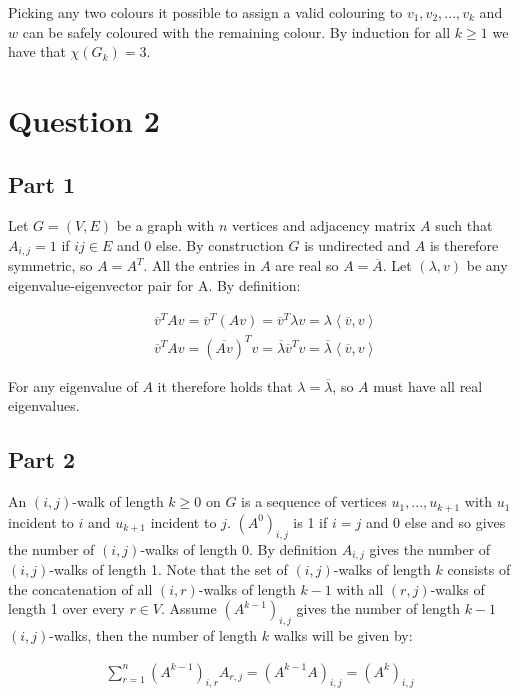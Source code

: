 \documentclass{article}
\begin{document}
Picking any two colours it possible to assign a valid colouring to $v_1, v_2,...,v_k$ and $w$ can be safely coloured with the remaining colour. By induction for all $k \geq 1$ we have that $\chi(G_k)=3$.

\section*{Question 2}

\subsection*{Part 1}

Let $G = (V,E)$ be a graph with $n$ vertices and adjacency matrix $A$ such that $A_{i,j} = 1$ if $ij \in E$ and 0 else. By construction $G$ is undirected and $A$ is therefore symmetric, so $A = A^T$. All the entries in $A$ are real so $A = \overline{A}$. Let $(\lambda,v)$ be any eigenvalue-eigenvector pair for A. By definition: 

\begin{align*}
    & \overline{v}^TAv = \overline{v}^T\left ( Av \right ) = \overline{v}^T \lambda v = \lambda \left \langle \overline{v},v \right \rangle \\
    & \overline{v}^TAv = \left ( \overline{Av} \right )^T v = \overline{\lambda} \overline{v}^T v = \overline{\lambda} \left \langle \overline{v},v \right \rangle
\end{align*}

For any eigenvalue of $A$ it therefore holds that $\lambda = \overline{\lambda}$, so $A$ must have all real eigenvalues. 

\subsection*{Part 2}

An $(i,j)$-walk of length $k \geq 0$ on $G$ is a sequence of vertices $u_1,...,u_{k+1}$ with $u_1$ incident to $i$ and $u_{k+1}$ incident to $j$.  $(A^0)_{i,j}$ is 1 if $i=j$ and 0 else and so gives the number of $(i,j)$-walks of length 0. By definition $A_{i,j}$ gives the number of $(i,j)$-walks of length 1. Note that the set of $(i,j)$-walks of length $k$ consists of the concatenation of all $(i,r)$-walks of length $k-1$ with all $(r,j)$-walks of length 1 over every $r \in V$. Assume $(A^{k-1})_{i,j}$ gives the number of length $k-1$ $(i,j)$-walks, then the number of length $k$ walks will be given by: 

\begin{align*}
    \sum_{r=1}^n \left ( A^{k-1} \right )_{i,r} A_{r,j} = \left ( A^{k-1} A \right )_{i,j} = \left ( A^k \right )_{i,j}  
\end{align*}
\end{document}
